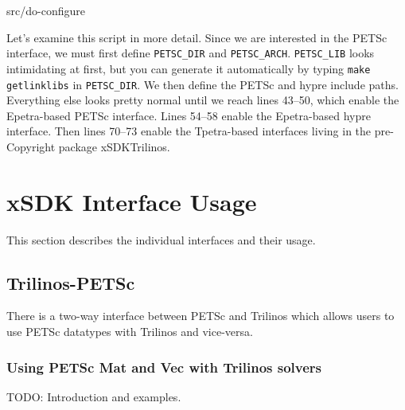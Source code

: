 \documentclass[pdf,12pt,report,strict]{SANDreport}
\begin{document}
\begin{lstinputlisting}[caption=do-configure,label=config-script]{src/do-configure}
\end{lstinputlisting}

Let's examine this script in more detail.  Since we are interested in the PETSc
interface, we must first define {\tt PETSC\_DIR} and {\tt PETSC\_ARCH}. 
{\tt PETSC\_LIB} looks intimidating at first, but you can generate it
automatically by typing {\tt make getlinklibs} in {\tt PETSC\_DIR}.  We then
define the PETSc and hypre include paths.  Everything else looks pretty normal
until we reach lines 43--50, which enable the Epetra-based PETSc interface. 
Lines 54--58 enable the Epetra-based hypre interface.  Then lines 70--73 enable
the Tpetra-based interfaces living in the pre-Copyright package xSDKTrilinos.

\chapter{xSDK Interface Usage}
This section describes the individual interfaces and their usage.

\section{Trilinos-PETSc}
There is a two-way interface between PETSc and Trilinos which allows users to
use PETSc datatypes with Trilinos and vice-versa.

\subsection{Using PETSc Mat and Vec with Trilinos solvers}
{\color{red}TODO: Introduction and examples.}
\end{document}
